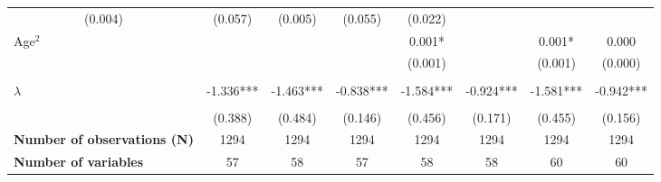 \begin{center}
\begin{table}
{\begin{tabular}{llllllll}
  \multicolumn{1}{c}{(0.004)} &
  \multicolumn{1}{c}{(0.057)} &
  \multicolumn{1}{c}{(0.005)} &
  \multicolumn{1}{c}{(0.055)} &
  \multicolumn{1}{c}{(0.022)} \\
\multicolumn{1}{l}{Age$^2$} &
  \multicolumn{1}{c}{} &
  \multicolumn{1}{c}{} &
  \multicolumn{1}{c}{} &
  \multicolumn{1}{c}{0.001*} &
  \multicolumn{1}{c}{} &
  \multicolumn{1}{c}{0.001*} &
  \multicolumn{1}{c}{0.000} \\
\multicolumn{1}{l}{} &
  \multicolumn{1}{c}{} &
  \multicolumn{1}{c}{} &
  \multicolumn{1}{c}{} &
  \multicolumn{1}{c}{(0.001)} &
  \multicolumn{1}{c}{} &
  \multicolumn{1}{c}{(0.001)} &
  \multicolumn{1}{c}{(0.000)} \\
  \\
\multicolumn{1}{l}{$\lambda$} &
  \multicolumn{1}{c}{-1.336***} &
  \multicolumn{1}{c}{-1.463***} &
  \multicolumn{1}{c}{-0.838***} &
  \multicolumn{1}{c}{-1.584***} &
  \multicolumn{1}{c}{-0.924***} &
  \multicolumn{1}{c}{-1.581***} &
  \multicolumn{1}{c}{-0.942***} \\
  \\
\multicolumn{1}{l}{} &
  \multicolumn{1}{c}{(0.388)} &
  \multicolumn{1}{c}{(0.484)} &
  \multicolumn{1}{c}{(0.146)} &
  \multicolumn{1}{c}{(0.456)} &
  \multicolumn{1}{c}{(0.171)} &
  \multicolumn{1}{c}{(0.455)} &
  \multicolumn{1}{c}{(0.156)} \\
\multicolumn{1}{l}{{\bf Number of observations (N)}} &
  \multicolumn{1}{c}{1294} &
  \multicolumn{1}{c}{1294} &
  \multicolumn{1}{c}{1294} &
  \multicolumn{1}{c}{1294} &
  \multicolumn{1}{c}{1294} &
  \multicolumn{1}{c}{1294} &
  \multicolumn{1}{c}{1294} \\
\multicolumn{1}{l}{{\bf Number of variables}} &
  \multicolumn{1}{c}{57} &
  \multicolumn{1}{c}{58} &
  \multicolumn{1}{c}{57} &
  \multicolumn{1}{c}{58} &
  \multicolumn{1}{c}{58} &
  \multicolumn{1}{c}{60} &
  \multicolumn{1}{c}{60} \\
\hline
\hline
\end{tabular}
}
\end{table}
\end{center}

